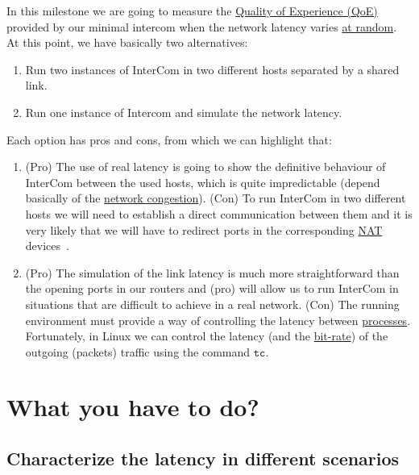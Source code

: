 In this milestone we are going to measure the
\href{https://en.wikipedia.org/wiki/Quality_of_experience}{Quality of
  Experience (QoE)} provided by our minimal intercom when the network
latency varies \href{https://en.wikipedia.org/wiki/Randomness}{at
  random}. At this point, we have basically two alternatives:
\begin{enumerate}
\item Run two instances of InterCom in two different hosts separated
  by a shared link.
\item Run one instance of Intercom and simulate the network latency.
\end{enumerate}
Each option has pros and cons, from which we can highlight that:
\begin{enumerate}
\item (Pro) The use of real latency is going to show the definitive
  behaviour of InterCom between the used hosts, which is quite
  impredictable (depend basically of the
  \href{https://en.wikipedia.org/wiki/Network_congestion}{network
    congestion}). (Con) To run InterCom in two different hosts we will
  need to establish a direct communication between them and it is very
  likely that we will have to redirect ports in the corresponding
  \href{https://en.wikipedia.org/wiki/Network_address_translation}{NAT}
  devices~\cite{}.
\item (Pro) The simulation of the link latency is much more
  straightforward than the opening ports in our routers and (pro) will
  allow us to run InterCom in situations that are difficult to achieve
  in a real network. (Con) The running environment must provide a way
  of controlling the latency between
  \href{https://en.wikipedia.org/wiki/Process_(computing)}{processes}. Fortunately,
  in Linux we can control the latency (and the
  \href{https://en.wikipedia.org/wiki/Bit_rate}{bit-rate}) of the
  outgoing (packets) traffic using the command
  \href{https://man7.org/linux/man-pages/man8/tc.8.html}{$\mathtt{tc}$}.
\end{enumerate}

\section{What you have to do?}

\subsection{Characterize the latency in different scenarios}

